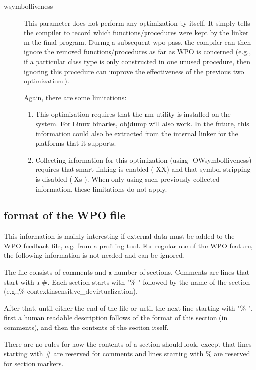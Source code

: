 \begin{description}
\item[wsymbolliveness]
This parameter does not perform any optimization by itself. It simply tells
the compiler to record which functions/procedures were kept by the linker in
the final program. During a subsequent wpo pass, the compiler can then
ignore the removed functions/procedures as far as WPO is concerned (e.g., if
a particular class type is only constructed in one unused procedure, then
ignoring this procedure can improve the effectiveness of the previous two
optimizations). 

Again, there are some limitations:
\begin{enumerate}
\item This optimization requires that the nm utility is installed on the system.
For Linux binaries, objdump will also work. In the future, this information
could also be extracted from the internal linker for the platforms that it
supports. 
\item Collecting information for this optimization (using -OWsymbolliveness)
requires that smart linking is enabled (-XX) and that symbol stripping is
disabled (-Xs-). When only using such previously collected information,
these limitations do not apply.
\end{enumerate}
\end{description}

\subsection{format of the WPO file}
This information is mainly interesting if external data must be added to
the WPO feedback file, e.g. from a profiling tool. For regular use of the
WPO feature, the following information is not needed and can be ignored.

The file consists of comments and a number of sections. Comments are lines
that start with a \#. Each section starts with "\% " followed by the name of
the section (e.g.,\% contextinsensitive\_devirtualization). 

After that, until either the end of the file or until the next line starting 
with "\% ", first a human readable description follows of the format of 
this section (in comments), and then the contents of the section itself. 

There are no rules for how the contents of a section should look, except
that lines starting with \# are reserved for comments and lines starting with
\% are reserved for section markers. 



